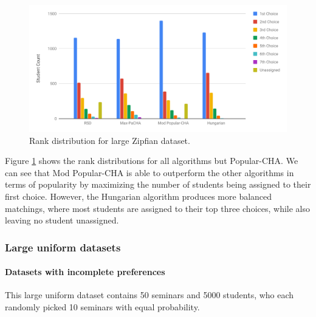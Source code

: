 \begin{figure}[h!]
  \centering
    \includegraphics[width=0.8\linewidth]{assets/plots/zipfian-medium.pdf}
    \caption{Rank distribution for large Zipfian dataset.}
    \label{fig:zipfian-medium-distribution}
\end{figure}

Figure \ref{fig:zipfian-medium-distribution} shows the rank distributions for all algorithms but Popular-CHA. We can see that Mod Popular-CHA is able to outperform the other algorithms in terms of popularity by maximizing the number of students being assigned to their first choice. However, the Hungarian algorithm produces more balanced matchings, where most students are assigned to their top three choices, while also leaving no student unassigned.

\subsubsection{Large uniform datasets}

\paragraph{Datasets with incomplete preferences}
This large uniform dataset contains 50 seminars and 5000 students, who each randomly picked 10 seminars with equal probability.  

